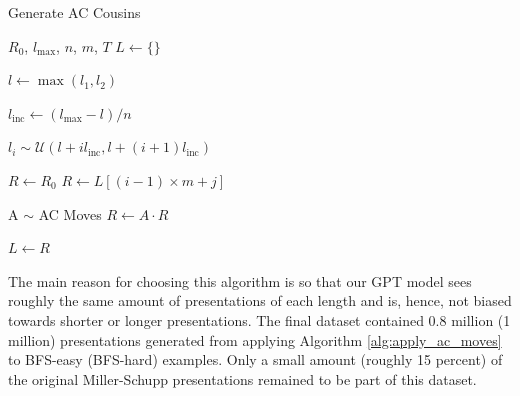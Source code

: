 \begin{algorithm}
	\caption{Generate AC Cousins}\label{alg:apply_ac_moves}
	\begin{algorithmic}
		\Require $R_0$, $l_{\text{max}}$, $n$, $m$, $T$
		\State $L \gets \{ \}$ 

		\State $l \gets \max(l_1, l_2)$


		\State $l_{\text{inc}} \gets (l_{\text{max}}-l)/n$




		\State $l_i \sim \mathcal{U}(l + i l_{\text{inc}} , l + (i+1) l_{\text{inc}})$

		\State $R \gets R_0$
		\Else
		\State $R \gets L[(i-1) \times m+j]$
		\EndIf




		\State A $\sim$ AC Moves
		\State $R \gets A \cdot R$

		\EndFor

		\State $L \gets R$


		\EndFor
		\EndFor
	\end{algorithmic}
\end{algorithm}

The main reason for choosing this algorithm is so that our GPT model sees roughly the same amount of presentations of each length and is, hence, not biased towards shorter or longer presentations.
The final dataset contained 0.8 million (1 million) presentations generated from applying Algorithm \autoref{alg:apply_ac_moves} to BFS-easy (BFS-hard) examples.
Only a small amount (roughly 15 percent) of the original Miller-Schupp presentations remained to be part of this dataset.


